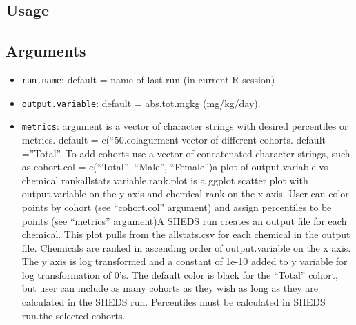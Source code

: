 \documentclass[
]{article}
\newenvironment{Shaded}{\begin{snugshade}}{\end{snugshade}}
\newcommand{\AttributeTok}[1]{\textcolor[rgb]{0.77,0.63,0.00}{#1}}
\newcommand{\FunctionTok}[1]{\textcolor[rgb]{0.00,0.00,0.00}{#1}}
\newcommand{\NormalTok}[1]{#1}
\newcommand{\SpecialCharTok}[1]{\textcolor[rgb]{0.00,0.00,0.00}{#1}}
\newcommand{\StringTok}[1]{\textcolor[rgb]{0.31,0.60,0.02}{#1}}
\providecommand{\tightlist}{%
  \setlength{\itemsep}{0pt}\setlength{\parskip}{0pt}}
\begin{document}
\hypertarget{usage-4}{%
\subsection{Usage}\label{usage-4}}

\begin{Shaded}
\end{Shaded}

\hypertarget{arguments-4}{%
\subsection{Arguments}\label{arguments-4}}

\begin{itemize}
\tightlist
\item
  \texttt{run.name}: default = name of last run (in current R session)
\item
  \texttt{output.variable}: default = abs.tot.mgkg (mg/kg/day).
\item
  \texttt{metrics}: argument is a vector of character strings with
  desired percentiles or metrics. default =
  c(``50\itemcohort.colagurment vector of different cohorts. default
  =''Total''. To add cohorts use a vector of concatenated character
  strings, such as cohort.col = c(``Total'', ``Male'', ``Female'')a plot
  of output.variable vs chemical rankallstats.variable.rank.plot is a
  ggplot scatter plot with output.variable on the y axis and chemical
  rank on the x axis. User can color points by cohort (see
  ``cohort.col'' argument) and assign percentiles to be points (see
  ``metrics'' argument)A SHEDS run creates an output file for each
  chemical. This plot pulls from the allstats.csv for each chemical in
  the output file. Chemicals are ranked in ascending order of
  output.variable on the x axis. The y axis is log transformed and a
  constant of 1e-10 added to y variable for log transformation of 0's.
  The default color is black for the ``Total'' cohort, but user can
  include as many cohorts as they wish as long as they are calculated in
  the SHEDS run. Percentiles must be calculated in SHEDS run.the
  selected cohorts.
\end{itemize}
\end{document}
